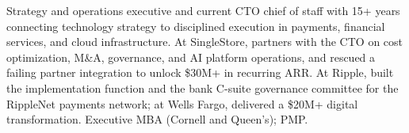 \documentclass[11pt,letterpaper,sans]{moderncv}
\begin{document}
\makecvtitle


\vspace{6pt}
\small{Strategy and operations executive and current CTO chief of staff with 15+ years connecting technology strategy to disciplined execution in payments, financial services, and cloud infrastructure. At SingleStore, partners with the CTO on cost optimization, M\&A, governance, and AI platform operations, and rescued a failing partner integration to unlock \$30M+ in recurring ARR. At Ripple, built the implementation function and the bank C-suite governance committee for the RippleNet payments network; at Wells Fargo, delivered a \$20M+ digital transformation. Executive MBA (Cornell and Queen's); PMP.}

\end{document}
